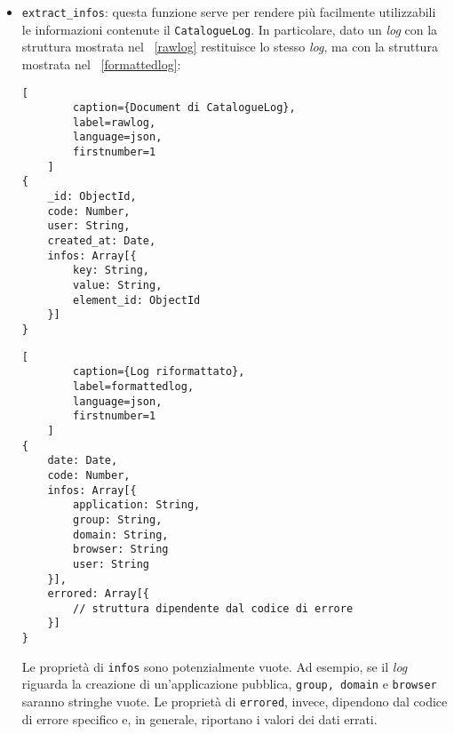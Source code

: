 \begin{itemize}
In tal caso verrà salvato come \texttt{CatalogueLog.value} la stringa ''Lorem ipsum dolor sit amet''. 

Al contrario, se 
\newline \texttt{data.element\_id} == 5770fadf7a1725abe77e0382 e 
\newline \texttt{data.dispname} == \textit{Mario Rossi} 

verrà salvato come \texttt{CatalogueLog.value} la stringa ''Mario Rossi''.
\item \texttt{extract\_infos}: questa funzione serve per rendere più facilmente utilizzabili le informazioni contenute il \texttt{CatalogueLog}. In particolare, dato un \textit{log} con la struttura mostrata nel \lstlistingname~\ref{rawlog} restituisce lo stesso \textit{log}, ma con la struttura mostrata nel \lstlistingname~\ref{formattedlog}:
\begin{lstlisting}[
		caption={Document di CatalogueLog},
		label=rawlog,
		language=json,
		firstnumber=1
	]
{
	_id: ObjectId,
	code: Number,
	user: String,
	created_at: Date,
	infos: Array[{
		key: String,
		value: String,
		element_id: ObjectId
	}]
}
\end{lstlisting}

\begin{lstlisting}[
		caption={Log riformattato},
		label=formattedlog,
		language=json,
		firstnumber=1
	]
{
	date: Date,
	code: Number,
	infos: Array[{
		application: String,
		group: String,
		domain: String,
		browser: String
		user: String
	}],
	errored: Array[{
		// struttura dipendente dal codice di errore
	}]
}
\end{lstlisting}
Le proprietà di \texttt{infos} sono potenzialmente vuote. Ad esempio, se il \textit{log} riguarda la creazione di un'applicazione pubblica, \texttt{group, domain} e \texttt{browser} saranno stringhe vuote. Le proprietà di \texttt{errored}, invece, dipendono dal codice di errore specifico e, in generale, riportano i valori dei dati errati.
\end{itemize}